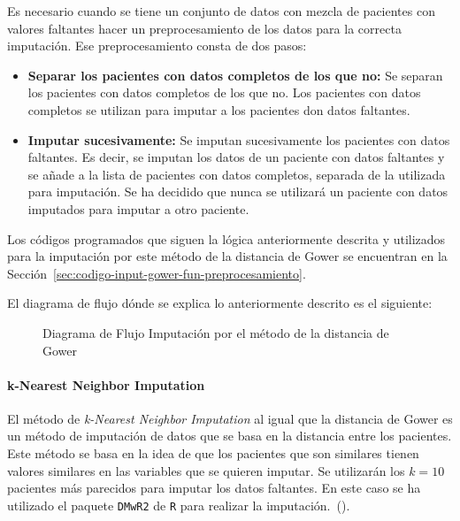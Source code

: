 Es necesario cuando se tiene un conjunto de datos con mezcla de pacientes con valores faltantes hacer un preprocesamiento de los datos para la correcta imputación. Ese preprocesamiento consta de dos pasos: 
\begin{itemize}
    \item \textbf{Separar los pacientes con datos completos de los que no:} Se separan los pacientes con datos completos de los que no. Los pacientes con datos completos se utilizan para imputar a los pacientes don datos faltantes.
    \item \textbf{Imputar sucesivamente:} Se imputan sucesivamente los pacientes con datos faltantes. Es decir, se imputan los datos de un paciente con datos faltantes y se añade a la lista de pacientes con datos completos, separada de la utilizada para imputación. Se ha decidido que nunca se utilizará un paciente con datos imputados para imputar a otro paciente.
\end{itemize}

Los códigos programados que siguen la lógica anteriormente descrita y utilizados para la imputación por este método de la distancia de Gower se encuentran en la Sección~\ref{sec:codigo-input-gower-fun-preprocesamiento}.

El diagrama de flujo dónde se explica lo anteriormente descrito es el siguiente: 

\newpage
\thispagestyle{empty}

\begin{landscape}
    \begin{figure}[htbp]
        \centering
        
        \caption{Diagrama de Flujo Imputación por el método de la distancia de Gower}
        \label{fig:svg-gower}
    \end{figure}
\end{landscape}
\restoregeometry 



\paragraph*{k-Nearest Neighbor Imputation}\label{sec:k_Nearest Neighbor_Imputation}

El método de \textit{k-Nearest Neighbor Imputation} al igual que la distancia de Gower es un método de imputación de datos que se basa en la distancia entre los pacientes. Este método se basa en la idea de que los pacientes que son similares tienen valores similares en las variables que se quieren imputar. Se utilizarán los $k = 10$ pacientes más parecidos para imputar los datos faltantes. En este caso se ha utilizado el paquete \texttt{DMwR2} de \texttt{R} para realizar la imputación.~(\cite{DMwR2}).

